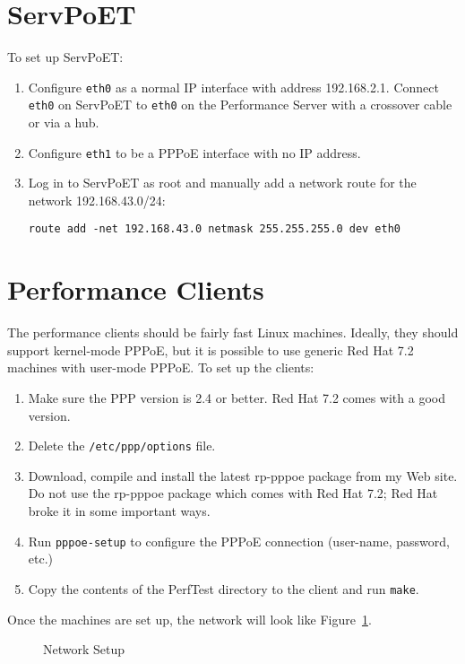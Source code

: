 \documentclass[11pt]{article}
\newcommand{\sv}{ServPoET}
\newcommand{\eps}{eps}
\newcommand{\eps}{pdf}
\begin{document}
\section{\sv{}}

To set up \sv{}:
\begin{enumerate}
\item Configure \texttt{eth0} as a normal IP interface with
address 192.168.2.1.  Connect \texttt{eth0} on \sv{} to \texttt{eth0}
on the Performance Server with a crossover cable or via a hub.
\item Configure \texttt{eth1} to be a PPPoE interface with no IP
  address.
\item Log in to \sv{} as root and manually add a network route for the network
  192.168.43.0/24:

  \mbox{\texttt{route add -net 192.168.43.0 netmask 255.255.255.0 dev eth0}}
\end{enumerate}

\section{Performance Clients}

The performance clients should be fairly fast Linux machines.  Ideally,
they should support kernel-mode PPPoE, but it is possible to use
generic Red Hat 7.2 machines with user-mode PPPoE.  To set up the
clients:
\begin{enumerate}
\item Make sure the PPP version is 2.4 or better.  Red Hat 7.2 comes with
  a good version.
\item Delete the \texttt{/etc/ppp/options} file.
\item Download, compile and install the latest rp-pppoe package from
  my Web site.  Do not use the rp-pppoe package which comes with Red Hat
  7.2; Red Hat broke it in some important ways.
\item Run \texttt{pppoe-setup} to configure the PPPoE connection (user-name,
  password, etc.)
\item Copy the contents of the PerfTest directory to the client and
  run \texttt{make}.
\end{enumerate}

Once the machines are set up, the network will look like Figure~\ref{fig:net}.
\begin{figure}[htbp]
  \begin{center}
    \epsfig{file=setup.\eps,width=\textwidth}
    \caption{Network Setup}
    \label{fig:net}
  \end{center}
\end{figure}
\end{document}
